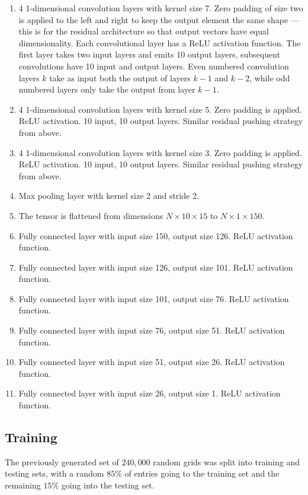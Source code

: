 \begin{enumerate}
\item 4 1-dimensional convolution layers with kernel size 7.  Zero padding of size two is applied to the left and right to keep the output element the same shape --- this is for the residual architecture so that output vectors have equal dimensionality.  Each convolutional layer has a ReLU activation function.  The first layer takes two input layers and emits 10 output layers, subsequent convolutions have 10 input and output layers.  Even numbered convolution layers $k$ take as input both the output of layers $k-1$ and $k-2$, while odd numbered layers only take the output from layer $k-1$.
\item 4 1-dimensional convolution layers with kernel size 5.  Zero padding is applied.  ReLU activation.  10 input, 10 output layers.  Similar residual pushing strategy from above.
\item 4 1-dimensional convolution layers with kernel size 3.  Zero padding is applied.  ReLU activation.  10 input, 10 output layers.  Similar residual pushing strategy from above.
\item Max pooling layer with kernel size 2 and stride 2.
\item The tensor is flattened from dimensions $N \times 10 \times 15$ to $N \times 1 \times 150$.
\item Fully connected layer with input size 150, output size 126.  ReLU activation function.
\item Fully connected layer with input size 126, output size 101.  ReLU activation function.
\item Fully connected layer with input size 101, output size 76.  ReLU activation function.
\item Fully connected layer with input size 76, output size 51.  ReLU activation function.
\item Fully connected layer with input size 51, output size 26.  ReLU activation function.
\item Fully connected layer with input size 26, output size 1.  ReLU activation function.
\end{enumerate}

\subsection{Training}

The previously generated set of $240,000$ random grids was split into training and testing sets, with a random $85\%$ of entries going to the training set and the remaining $15\%$ going into the testing set.

